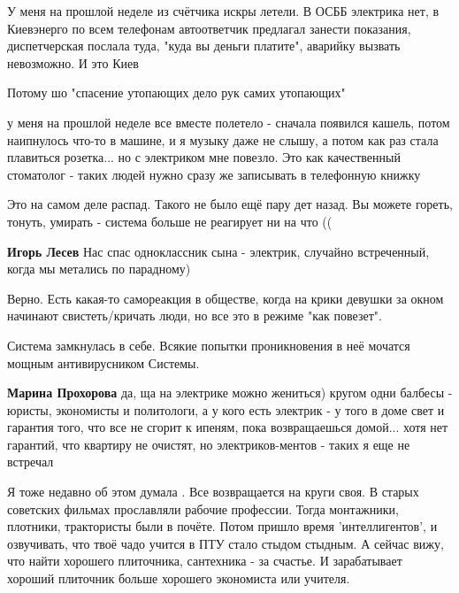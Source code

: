 \begin{itemize}
\begin{itemize}
\end{itemize} %


У меня на прошлой неделе из счётчика искры летели. В ОСББ электрика нет, в
Киевэнерго по всем телефонам автоответчик предлагал занести показания,
диспетчерская послала туда, "куда вы деньги платите", аварийку вызвать
невозможно. И это Киев

\begin{itemize} %
Потому шо "спасение утопающих дело рук самих утопающих"


у меня на прошлой неделе все вместе полетело - сначала появился кашель, потом
наипнулось что-то в машине, и я музыку даже не слышу, а потом как раз стала
плавиться розетка... но с электриком мне повезло. Это как качественный
стоматолог - таких людей нужно сразу же записывать в телефонную книжку


Это на самом деле распад. Такого не было ещё пару дет назад. Вы можете гореть, тонуть, умирать - система больше не реагирует ни на что ((

\textbf{Игорь Лесев} Нас спас одноклассник сына - электрик, случайно встреченный, когда мы метались по парадному)


Верно. Есть какая-то самореакция в обществе, когда на крики девушки за окном
начинают свистеть/кричать люди, но все это в режиме "как повезет".

Система замкнулась в себе. Всякие попытки проникновения в неё мочатся мощным антивирусником Системы.

\textbf{Марина Прохорова} да, ща на электрике можно жениться) кругом одни балбесы - юристы, экономисты и политологи, а у кого есть электрик - у того в доме свет и гарантия того, что все не сгорит к ипеням, пока возвращаешься домой... хотя нет гарантий, что квартиру не очистят, но электриков-ментов - таких я еще не встречал


Я тоже недавно об этом думала . Все возвращается на круги своя. В старых
советских фильмах прославляли рабочие профессии. Тогда монтажники, плотники,
трактористы были в почёте. Потом пришло время 'интеллигентов', и озвучивать,
что твоё чадо учится в ПТУ стало стыдом стыдным. А сейчас вижу, что найти
хорошего плиточника, сантехника - за счастье. И зарабатывает хороший плиточник
больше хорошего экономиста или учителя.


\end{itemize}
\end{itemize}
